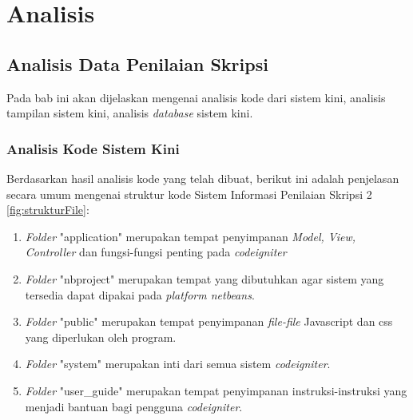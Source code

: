 \chapter{Analisis}
\label{chap: analisis}

\section{Analisis Data Penilaian Skripsi}
\label{sec: analisisData}

	Pada bab ini akan dijelaskan mengenai analisis kode dari sistem kini, analisis tampilan sistem kini, analisis \textit{database} sistem kini.
	
	\subsection{Analisis Kode Sistem Kini}
	\label{sec: analisisKode}
	
		Berdasarkan hasil analisis kode yang telah dibuat, berikut ini adalah penjelasan secara umum mengenai struktur kode Sistem Informasi Penilaian Skripsi 2 \ref{fig:strukturFile}:
		
		\begin{enumerate}
			\item \textit{Folder} "application" merupakan tempat penyimpanan \textit{Model, View, Controller} dan fungsi-fungsi penting pada \textit{codeigniter}
			\item \textit{Folder} "nbproject" merupakan tempat yang dibutuhkan agar sistem yang tersedia dapat dipakai pada \textit{platform netbeans}. 
			\item \textit{Folder} "public" merupakan tempat penyimpanan \textit{file-file} Javascript dan css yang diperlukan oleh program.
			\item \textit{Folder} "system" merupakan inti dari semua sistem \textit{codeigniter}.
			\item \textit{Folder} "user\_guide" merupakan tempat penyimpanan instruksi-instruksi yang menjadi bantuan bagi pengguna \textit{codeigniter}.
		\end{enumerate}
		
